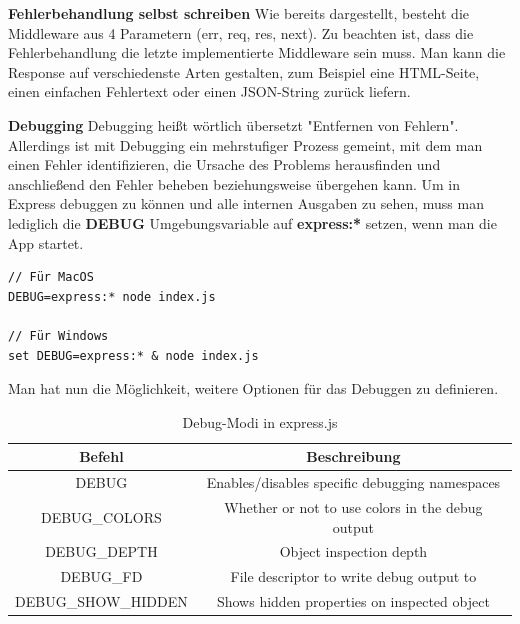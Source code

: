 \textbf{Fehlerbehandlung selbst schreiben}
\newline
Wie bereits dargestellt, besteht die Middleware aus 4 Parametern (err, req, res, next). Zu beachten ist, dass die Fehlerbehandlung die letzte implementierte Middleware sein muss. Man kann die Response auf verschiedenste Arten gestalten, zum Beispiel eine HTML-Seite, einen einfachen Fehlertext oder einen JSON-String zurück liefern.
\cite{express_js_error_handling}

\textbf{Debugging}
\newline
Debugging heißt wörtlich übersetzt "Entfernen von Fehlern". Allerdings ist mit Debugging ein mehrstufiger Prozess gemeint, mit dem man einen Fehler identifizieren, die Ursache des Problems herausfinden und anschließend den Fehler beheben beziehungsweise übergehen kann.
\cite{debugging_allgemein}
\newline
Um in Express debuggen zu können und alle internen Ausgaben zu sehen, muss man lediglich die \textbf{DEBUG} Umgebungsvariable auf \textbf{express:*} setzen, wenn man die App startet.
\begin{verbatim}
// Für MacOS
DEBUG=express:* node index.js

// Für Windows
set DEBUG=express:* & node index.js
\end{verbatim}
Man hat nun die Möglichkeit, weitere Optionen für das Debuggen zu definieren.
\begin{table}[h]
\caption{Debug-Modi in express.js}
\label{demo-table}
\begin{tabular}{||c c||}
        \hline
        Befehl & Beschreibung \\ [0.5ex] 
        \hline\hline
        DEBUG & Enables/disables specific debugging namespaces \\ 
        \hline
        DEBUG\_COLORS & Whether or not to use colors in the debug output \\
        \hline
        DEBUG\_DEPTH & Object inspection depth \\
        \hline
        DEBUG\_FD & File descriptor to write debug output to \\
        \hline
        DEBUG\_SHOW\_HIDDEN & Shows hidden properties on inspected object \\ [1ex] 
        \hline
    \end{tabular}
\end{table}
\cite{Express_js_third_party_middlewares}

